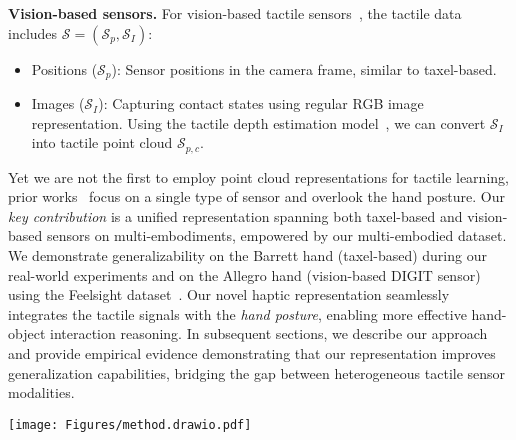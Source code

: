 \documentclass[11pt, a4paper, logo, twocolumn]{brown}
\newcommand{\shortname}{V-HOP\xspace}
\begin{document}
\textbf{Vision-based sensors.}
For vision-based tactile sensors~\cite{lambeta_digit_2020, yuan_gelsight_2017, donlon_gelslim_2018, taylor_gelslim_2022}, the tactile data includes $\mathcal{S} = (\mathcal{S}_p, \mathcal{S}_I)$:
\begin{itemize}
    \item Positions ($\mathcal{S}_p$): Sensor positions in the camera frame, similar to taxel-based.
    \item Images ($\mathcal{S}_I$): Capturing contact states using regular RGB image representation. Using the tactile depth estimation model~\cite{bauza_tactile_2019, suresh_neuralfeels_2024, kuppuswamy_fast_2020, suresh_midastouch_2023, suresh_shapemap_2022, ambrus_monocular_2021}, we can convert $\mathcal{S}_I$ into tactile point cloud $\mathcal{S}_{p, c}$.
\end{itemize}

Yet we are not the first to employ point cloud representations for tactile learning, prior works~\cite{dikhale_visuotactile_2022, suresh_neuralfeels_2024, watkins-valls_multi-modal_2019, falco_cross-modal_2017} focus on a single type of sensor and overlook the hand posture.
Our \emph{key contribution} is a unified representation spanning both taxel-based and vision-based sensors on multi-embodiments, empowered by our multi-embodied dataset. 
We demonstrate generalizability on the Barrett hand (taxel-based) during our real-world experiments and on the Allegro hand (vision-based DIGIT sensor) using the Feelsight dataset~\cite{suresh_neuralfeels_2024}.
Our novel haptic representation seamlessly integrates the tactile signals with the \emph{hand posture}, enabling more effective hand-object interaction reasoning.
In subsequent sections, we describe our approach and provide empirical evidence demonstrating that our representation improves generalization capabilities, bridging the gap between heterogeneous tactile sensor modalities.



\begin{figure*}
    \centering
    \texttt{[image: Figures/method.drawio.pdf]}
    \caption{
    \textbf{Network design of \shortname.}
    The visual modality, based on FoundationPose~\cite{wen_foundationpose_2024}, uses a visual encoder to process RGB-D observations (real and rendered) into feature maps, which are concatenated and refined through a ResBlock to produce visual embeddings~\cite{dosovitskiy_image_2021}.
    The haptic modality encodes a unified hand-object point cloud, derived from 9D hand $\mathcal{P}_h$ and object $\mathcal{P}_o$ point clouds, into a haptic embedding that captures hand-object interactions.
    The \textcolor{red}{\textbf{red dot}} in the figure denotes the activated tactile sensor.
    These visual and haptic embeddings are processed by Transformer encoders to estimate 3D translation and rotation.
    }
    \label{fig:method}
\end{figure*}
\end{document}
